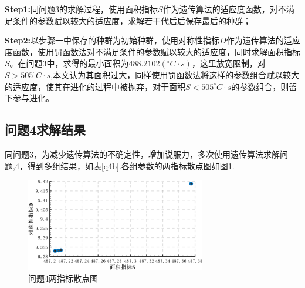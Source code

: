 \documentclass[withoutpreface,bwprint]{cumcmthesis} %
\begin{document}
\textbf{Step1:}同问题3的求解过程，使用面积指标$S$作为遗传算法的适应度函数，对不满足条件的参数赋以较大的适应度，求解若干代后后保存最后的种群；

\textbf{Step2:}以步骤一中保存的种群为初始种群，使用对称性指标$D$作为遗传算法的适应度函数，使用罚函数法对不满足条件的参数赋以较大的适应度，同时求解面积指标$S$。在问题3中，求得的最小面积为$488.2102(^\circ C \cdot s)$，这里放宽限制，对$S>505^\circ C \cdot s$,本文认为其面积过大，同样使用罚函数法将这样的参数组合赋以较大的适应度，使其在进化的过程中被抛弃，对于面积$S<505^\circ C \cdot s$的参数组合，则留下参与进化。

\subsection{问题4求解结果}
同问题3，为减少遗传算法的不确定性，增加说服力，多次使用遗传算法求解问题,4，得到多组结果，如表\ref{q4b}.各组参数的两指标散点图如图\ref{问题4两指标散点图}.
	\begin{figure}[H]
	\centering
	\includegraphics[width=0.70\textwidth]{问题4两指标散点图}
	\caption{问题4两指标散点图}
	\label{问题4两指标散点图}
\end{figure}
\end{document}
